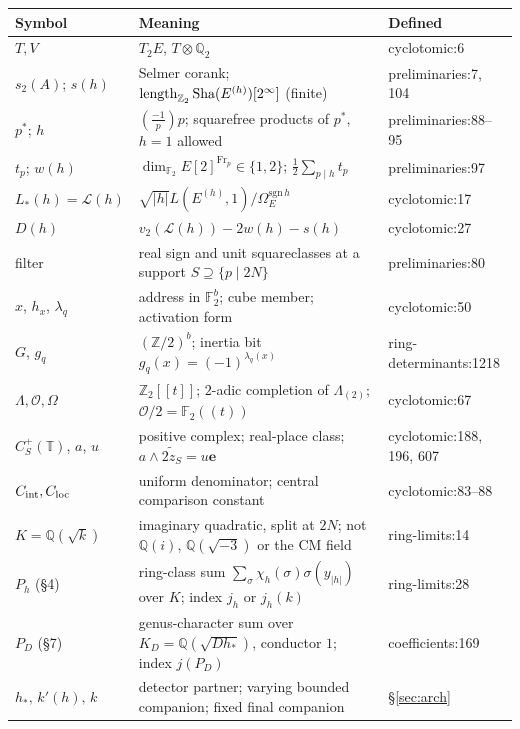\documentclass[11pt]{article}
\theoremstyle{remark}
\newcommand{\Q}{\mathbb Q}
\newcommand{\Z}{\mathbb Z}
\newcommand{\F}{\mathbb F}
\newcommand{\cO}{\mathcal O}
\newcommand{\cL}{\mathcal L}
\newcommand{\Sha}{\text{\rm Sha}}
\DeclareMathOperator{\Fr}{Fr}
\DeclareMathOperator{\length}{length}
\newcommand{\src}[2]{\textsf{\small #1:#2}}
\begin{document}
{\small
\renewcommand{\arraystretch}{1.2}\begin{longtable}{@{}P{0.19\textwidth}P{0.55\textwidth}P{0.2\textwidth}@{}}
\toprule
Symbol & Meaning & Defined \\
\midrule
\endhead
$T,V$ & $T_2E$, $T\otimes\Q_2$ & \src{cyclotomic}{6} \\
$s_2(A)$; $s(h)$ & Selmer corank; $\length_{\Z_2}\Sha(E^{(h)})[2^\infty]$ (finite) & \src{preliminaries}{7, 104} \\
$p^*$; $h$ & $(\frac{-1}p)p$; squarefree products of $p^*$, $h=1$ allowed & \src{preliminaries}{88--95} \\
$t_p$; $w(h)$ & $\dim_{\F_2}E[2]^{\Fr_p}\in\{1,2\}$; $\frac12\sum_{p\mid h}t_p$ & \src{preliminaries}{97} \\
$L_*(h)=\cL(h)$ & $\sqrt{|h|}L(E^{(h)},1)/\Omega_E^{\mathrm{sgn}\,h}$ & \src{cyclotomic}{17} \\
$D(h)$ & $v_2(\cL(h))-2w(h)-s(h)$ & \src{cyclotomic}{27} \\
filter & real sign and unit squareclasses at a support $S\supseteq\{p\mid2N\}$ & \src{preliminaries}{80} \\
$x$, $h_x$, $\lambda_q$ & address in $\F_2^b$; cube member; activation form & \src{cyclotomic}{50} \\
$G$, $g_q$ & $(\Z/2)^b$; inertia bit $g_q(x)=(-1)^{\lambda_q(x)}$ & \src{ring-determinants}{1218} \\
$\Lambda,\cO,\Omega$ & $\Z_2[[t]]$; $2$-adic completion of $\Lambda_{(2)}$; $\cO/2=\F_2((t))$ & \src{cyclotomic}{67} \\
$C^+_S(\mathbb T)$, $a$, $u$ & positive complex; real-place class; $a\wedge\widetilde{2z_S}=u\mathbf e$ & \src{cyclotomic}{188, 196, 607} \\
$C_{\rm int},C_{\rm loc}$ & uniform denominator; central comparison constant & \src{cyclotomic}{83--88} \\
$K=\Q(\sqrt k)$ & imaginary quadratic, split at $2N$; not $\Q(i)$, $\Q(\sqrt{-3})$ or the CM field & \src{ring-limits}{14} \\
$P_h$ (\S4) & ring-class sum $\sum_\sigma\chi_h(\sigma)\sigma(y_{|h|})$ over $K$; index $j_h$ or $j_h(k)$ & \src{ring-limits}{28} \\
$P_D$ (\S7) & genus-character sum over $K_D=\Q(\sqrt{Dh_*})$, conductor $1$; index $j(P_D)$ & \src{coefficients}{169} \\
$h_*,\,k'(h),\,k$ & detector partner; varying bounded companion; fixed final companion & \S\ref{sec:arch} \\

\end{longtable}}
\end{document}
